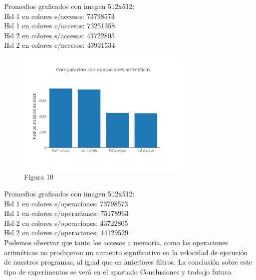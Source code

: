 \documentclass[a4paper]{article}
\begin{document}
Promedios graficados con imagen 512x512:
\\

Hsl 1 en colores s/accesos: 73798573
\\

Hsl 1 en colores c/accesos: 73251358
\\

Hsl 2 en colores s/accesos: 43722805
\\

Hsl 2 en colores c/accesos: 43931534
\\



\begin{figure}[h]
  \centering
    \includegraphics[width=0.75\textwidth]{imagenes/ComparacionConOperacionesAritmeticasHslColores.png}
  \caption{Figura 10}
  \label{fig:graficohsl4}
\end{figure}
 \FloatBarrier

Promedios graficados con imagen 512x512:
\\

Hsl 1 en colores s/operaciones: 73798573
\\

Hsl 1 en colores c/operaciones: 75178963
\\

Hsl 2 en colores s/operaciones: 43722805
\\

Hsl 2 en colores c/operaciones: 44129529
\\

Podemos observar que tanto los accesos a memoria, como las operaciones aritméticas no produjeron un aumento significativo en la velocidad de ejecución de nuestros programas, al igual que en anteriores filtros. La conclusión sobre este tipo de experimentos se verá en el apartado Conclusiones y trabajo futuro.
\end{document}
